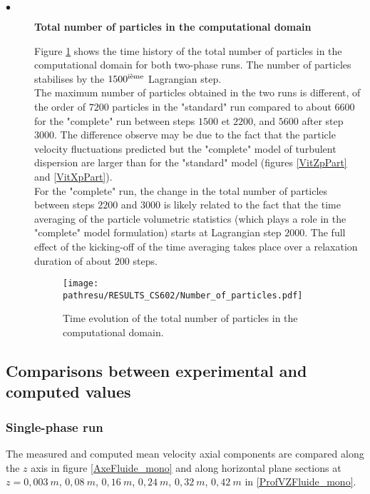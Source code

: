 \documentclass[a4paper,twoside,12pt]{article}
\newcommand{\pathresu}{./FIGURES}
\begin{document}
\begin{description}
   \item[$\bullet$] \textbf{Total number of particles in the computational domain}

         Figure \ref{nbpart} shows the time history of the total number of particles in the computational domain for both two-phase runs. The number of particles stabilises by the $1500^{\mbox{\scriptsize{ième}}}$ Lagrangian step. \\ The maximum number of particles obtained in the two runs is different, of the order of $7200$ particles in the "standard" run compared to about $6600$ for the "complete" run between steps $1500$ et $2200$, and $5600$ after step $3000$. The difference observe may be due to the fact that the particle velocity fluctuations predicted but the "complete" model of turbulent dispersion are larger than for the "standard" model (figures \ref{VitZpPart} and \ref{VitXpPart}).\\
         For the "complete" run, the change in the total number of particles between steps $2200$ and $3000$ is likely related to the fact that the time averaging of the particle volumetric statistics (which plays a role in the "complete" model formulation) starts at Lagrangian step $2000$. The full effect of the kicking-off of the time averaging takes place over a relaxation duration of about $200$ steps.

         \begin{figure}[htp]
            \centerline{\texttt{[image: \\pathresu/RESULTS\_CS602/Number\_of\_particles.pdf]}}
            \caption{Time evolution of the total number of particles in the computational domain.}
            \label{nbpart}
         \end{figure}

\end{description}

\clearpage

\subsection{Comparisons between experimental and computed values}

\subsubsection{Single-phase run}

The measured and computed mean velocity axial components are compared along the $z$ axis in figure \ref{AxeFluide_mono} and along horizontal plane sections at $z = 0,003~m$, $0,08~m$, $0,16~m$, $0,24~m$, $0,32~m$, $0,42~m$ in \ref{ProfVZFluide_mono}.
\end{document}
